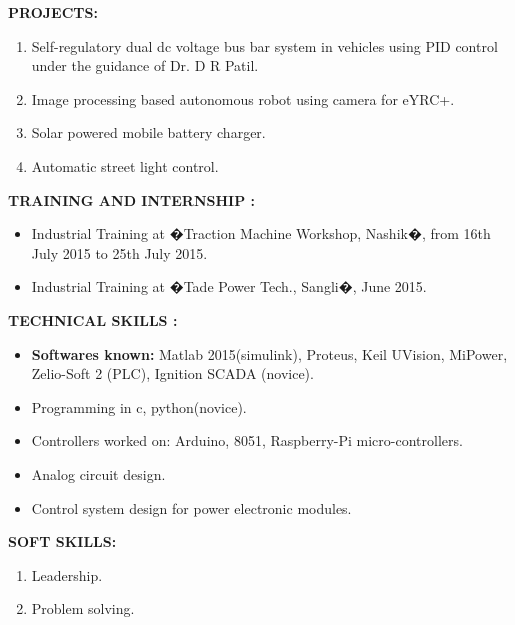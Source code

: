 \documentclass[12pt]{article}
\begin{document}
\begin{flushleft}

\begin{flushleft}
\textbf{PROJECTS:}
\end{flushleft}
\begin{enumerate}
\item Self-regulatory dual dc voltage bus bar system in vehicles using PID control under the guidance of Dr. D R Patil.
\item Image processing based autonomous robot using camera for eYRC+. 
\item Solar powered mobile battery charger.
\item  Automatic street light control. 
\end{enumerate}


\begin{flushleft} 
\textbf{TRAINING AND INTERNSHIP :}
\begin{itemize}
\item Industrial Training at �Traction Machine Workshop, Nashik�, from 16th July 2015
to 25th July 2015.
\item Industrial Training at �Tade Power Tech., Sangli�, June 2015.
\end{itemize}
\end{flushleft}


\begin{flushleft}
\textbf{TECHNICAL SKILLS : }
\begin{itemize}
\item \textbf{Softwares known:}  Matlab 2015(simulink), Proteus, Keil UVision, MiPower, Zelio-Soft 2 (PLC), Ignition SCADA (novice).
\item Programming in c, python(novice).
\item Controllers worked on: Arduino, 8051, Raspberry-Pi micro-controllers.
\item Analog circuit design.
\item Control system design for power electronic modules.
\end{itemize}
\end{flushleft}


\begin{flushleft}
\textbf{SOFT SKILLS:}
\begin{enumerate}
\item Leadership.
\item Problem solving. 
\end{enumerate}


\end{flushleft}
\end{flushleft}
\end{document}
